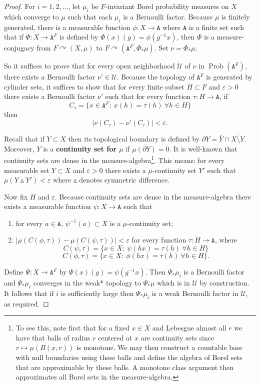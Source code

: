 \documentclass[11pt]{amsart}
\theoremstyle{definition}
\theoremstyle{remark}
\newcommand{\cU}{\mathcal{U}}
\newcommand{\Prob}{\operatorname{Prob}}
\newcommand{\eps}{\varepsilon}
\renewcommand{\epsilon}{\eps}
\def\cc{{\curvearrowright}}
\begin{document}
\begin{proof}
    For $i=1,2,\ldots$, let $\mu_i$ be $F$-invariant Borel probability measures on $X$ which converge to $\mu$ such that each $\mu_i$ is a Bernoulli factor. Because $\mu$ is finitely generated, there is a measurable function $\phi:X \to \mathtt{A}$ where $\mathtt{A}$ is a finite set such that if $\Phi:X \to \mathtt{A}^F$ is defined by $\Phi(x)(g)=\phi(g^{-1}x)$, then $\Phi$ is a measure-conjugacy from $F \cc (X,\mu)$ to $F \cc (\mathtt{A}^F, \Phi_*\mu)$. Set $\nu = \Phi_*\mu$.

So it suffices to prove that for every open neighborhood $\cU$ of $\nu$ in $\Prob(\mathtt{A}^F)$, there exists a Bernoulli factor $\nu' \in \cU$. Because the topology of $\mathtt{A}^F$ is generated by cylinder sets, it suffices to show that for every finite subset $H \subset F$ and $\epsilon>0$ there exists a Bernoulli factor $\nu'$ such that for every function $\tau:H \to \mathtt{A}$, if 
$$C_\tau = \{x\in \mathtt{A}^F:~ x(h)=\tau(h)~\forall h \in H\}$$
then 
$$|\nu( C_\tau) - \nu'(C_\tau)| < \epsilon.$$

Recall that if $Y \subset X$ then its topological boundary is defined by
$\partial Y = \bar{Y} \cap \overline{X\setminus Y}.$
    Moreover, $Y$ is a \textbf{continuity set for $\mu$} if $\mu(\partial Y)=0$.  It is well-known that continuity sets are dense in the measure-algebra\footnote{To see this, note first that for a fixed $x\in X$ and Lebesgue almost all $r$ we have that balls of radius $r$ centered at $x$ are continuity sets since $r \mapsto \mu(B(x,r))$ is monotone.  We may then construct a countable base with null boundaries using these balls and define the algebra of Borel sets that are approximable by these balls. A monotone class argument then approximates all Borel sets in the measure-algebra. }. 
    This means: for every measurable set $Y \subset X$ and $\epsilon>0$ there exists a $\mu$-continuity set $Y'$ such that $\mu(Y \vartriangle Y')<\epsilon$ where $\vartriangle$ denotes symmetric difference. 

    Now fix $H$ and $\epsilon$. Because continuity sets are dense in the measure-algebra there exists a measurable function  $\psi:X \to \mathtt{A}$ such that
    \begin{enumerate}
        \item for every $a\in \mathtt{A}$, $\psi^{-1}(a) \subset X$ is a $\mu$-continuity set;
        \item $|\mu(C(\phi,\tau)) - \mu(C(\psi,\tau))|<\epsilon$ for every function $\tau: H \to \mathtt{A}$, where
        $$C(\psi,\tau) =\{x\in X:~ \psi(hx)=\tau(h) ~\forall h \in H\}$$
        $$C(\phi,\tau) =\{x\in X:~ \phi(hx)=\tau(h) ~\forall h \in H\}.$$
    \end{enumerate}
Define $\Psi: X \to \mathtt{A}^F$ by $\Psi(x)(g)=\psi(g^{-1}x)$. Then $\Psi_*\mu_i$ is a Bernoulli factor  and $\Psi_*\mu_i$ converges in the weak* topology to $\Psi_*\mu$ which is in $\cU$ by construction. It follows that if $i$ is sufficiently large then $\Psi_*\mu_i$ is a weak Bernoulli factor in $\cU$, as required.
\end{proof}
\end{document}

